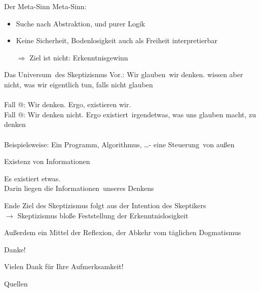 \documentclass[12pt]{beamer}
\makeatletter
\newcommand*{\rom}[1]{\expandafter\@slowromancap\romannumeral #1@}
\makeatother
\begin{document}
\begin{frame}{Der Meta-Sinn}
Meta-Sinn:
\begin{itemize}
\item Suche nach Abstraktion, und purer Logik
\item Keine Sicherheit, Bodenlosigkeit auch als Freiheit interpretierbar
\item[$\Rightarrow$] Ziel ist nicht: Erkenntnisgewinn
\end{itemize}
\end{frame}


\begin{frame}{Das \glqq Universum\grqq\ des Skeptizismus}
Vor.: Wir \glqq glauben\grqq\ wir denken. wissen aber nicht, was wir eigentlich tun, falls nicht \glqq glauben\grqq \\
\ \\
Fall \rom{1}: Wir denken. Ergo, existieren \glqq wir\grqq . \\
Fall \rom{2}: Wir denken nicht. Ergo \glqq existiert\grqq\ irgendetwas, was uns glauben macht, zu denken\\
\ \\
Beispielsweise: Ein Programm, Algorithmus, \ldots - eine \glqq Steuerung\grqq\ von \glqq außen\grqq
\end{frame}

\begin{frame}{Existenz von Informationen}
\begin{center}
Es existiert \glqq etwas\grqq .\\
Darin liegen die \glqq Informationen\grqq\ unseres \glqq Denkens\grqq
\end{center}
\end{frame}

\begin{frame}{Ende}
Ziel des Skeptizismus folgt aus der Intention des Skeptikers\\
$\rightarrow$ Skeptizismus bloße Feststellung der Erkenntnislosigkeit\\
\begin{center}
Außerdem ein Mittel der Reflexion, der Abkehr vom täglichen Dogmatismus
\end{center}
\end{frame}

\begin{frame}{Danke!}
\begin{center}
{\Large Vielen Dank für Ihre Aufmerksamkeit!}
\end{center}
\end{frame}

\nocite{*}

\begin{frame}[t, allowframebreaks]{Quellen}
\printbibliography
\end{frame}

%
%
%
\end{document}
